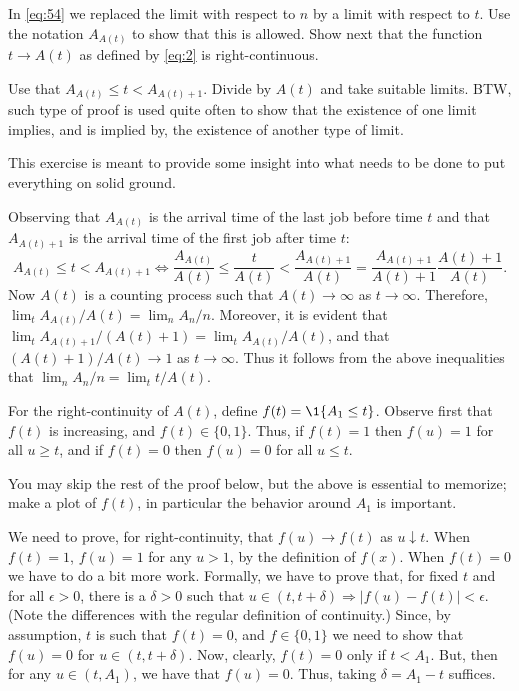 \begin{extra}[\faRocket]
  In \cref{eq:54} we replaced the limit with respect to $n$ by a limit with respect to $t$.
  Use the notation $A_{A(t)}$ to show that this is allowed.
  Show next that the function $t\to A(t)$ as defined by \cref{eq:2} is right-continuous.
\begin{hint}
      Use that $A_{A(t)} \leq t < A_{A(t)+1}$.
      Divide by $A(t)$ and take suitable limits.
      BTW, such type of proof is used quite often to show that the existence of one limit implies, and is implied by, the existence of another type of limit.
\end{hint}
\begin{solution}
   This exercise is meant to provide some insight into what needs to be done to put everything on solid ground.


   Observing that $A_{A(t)}$ is the arrival time of the last job before time $t$ and that $A_{A(t)+1}$ is the arrival time of the first job after time $t$:
  \begin{equation*}
    A_{A(t)}  \leq t  < A_{A(t)+1} \Leftrightarrow 
    \frac{A_{A(t)}} {A(t)}  \leq \frac{t}{A(t)}  <\frac{A_{A(t)+1}}{A(t)} = \frac{A_{A(t)+1}}{A(t)+1}\frac{A(t)+1}{A(t)}.
  \end{equation*}
  Now $A(t)$ is a counting process such that $A(t)\to\infty$ as $t\to\infty$.
  Therefore, $\lim_t A_{A(t)}/A(t) = \lim_n A_n/n$.
  Moreover, it is evident that $\lim_t A_{A(t)+1}/(A(t)+1) = \lim_t A_{A(t)}/A(t)$, and that $(A(t)+1)/A(t)\to 1$ as $t\to\infty$.
  Thus it follows from the above inequalities that $\lim_n A_n/n = \lim_t t/A(t)$.
     
  For the right-continuity of $A(t)$, define $f(t) = \1{A_1 \leq t}$.
  Observe first that $f(t)$ is increasing, and $f(t)\in\{0,1\}$.
  Thus, if $f(t)=1$ then $f(u)=1$ for all $u\geq t$, and if $f(t)=0$ then $f(u) = 0$ for all $u\leq t$.

  You may skip the rest of the proof below, but the above is essential to memorize; make a plot of $f(t)$, in particular the behavior around $A_1$ is important.

  We need to prove, for right-continuity, that $f(u)\to f(t) $ as $u\downarrow t$.
  When $f(t)=1$, $f(u)=1$ for any $u>1$, by the definition of $f(x)$.
  When $f(t)=0$ we have to do a bit more work.
  Formally, we have to prove that, for fixed $t$ and for all $\epsilon > 0$, there is a $\delta>0$ such that $u\in(t, t+\delta) \Rightarrow |f(u) -f(t)| < \epsilon$.
  (Note the differences with the regular definition of continuity.)
  Since, by assumption, $t$ is such that $f(t)=0$, and $f\in\{0,1\}$ we need to show that $f(u)=0$ for $u\in(t, t+\delta)$.
  Now, clearly, $f(t)=0$ only if $t < A_1$.
  But, then for any $u\in(t, A_1)$, we have that $f(u) = 0$.
  Thus, taking $\delta = A_1 - t$ suffices.


\end{solution}
\end{extra}
